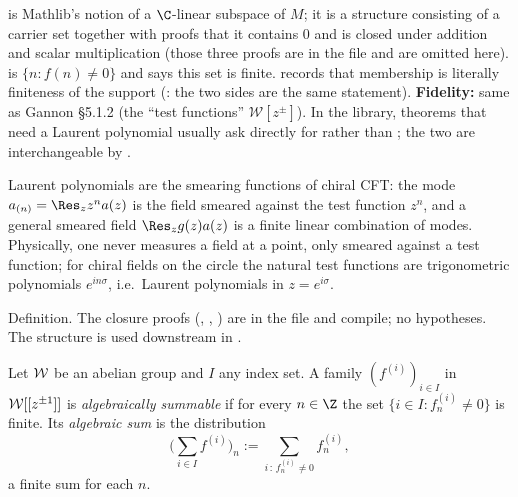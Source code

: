 \begin{dictionary}
 is Mathlib's notion of a $\C$-linear subspace of $M$; it is a structure
consisting of a carrier set together with proofs that it contains $0$ and is closed under
addition and scalar multiplication (those three proofs are in the file and are omitted here).
 is $\{n : f(n)\neq0\}$ and  says this set is finite.
 records that membership is literally finiteness of the support
(: the two sides are the same statement). \textbf{Fidelity:} same as Gannon §5.1.2
(the ``test functions'' $\mathcal W[z^{\pm}]$). In the library, theorems that need a Laurent
polynomial usually ask directly for  rather than
; the two are interchangeable by .
\end{dictionary}

\begin{physics}
Laurent polynomials are the smearing functions of chiral CFT: the mode $a_{(n)} = \Res_z z^na(z)$ is
the field smeared against the test function $z^n$, and a general smeared field
$\Res_z g(z)a(z)$ is a finite linear combination of modes. Physically, one never measures a field
at a point, only smeared against a test function; for chiral fields on the circle the natural test
functions are trigonometric polynomials $e^{in\sigma}$, i.e.\ Laurent polynomials in $z = e^{i\sigma}$.
\end{physics}

\begin{status}
Definition. The closure proofs (, , ) are in the file and
compile; no hypotheses. The structure  is used downstream in
.
\end{status}

\begin{definition}\label{l01:def:algsum}
Let $\mathcal{W}$ be an abelian group and $I$ any index set. A family
$(f^{(i)})_{i\in I}$ in $\mathcal{W}[[z^{\pm1}]]$ is \emph{algebraically summable} if for every $n\in\Z$
the set $\{i\in I : f^{(i)}_n\neq0\}$ is finite. Its \emph{algebraic sum} is the distribution
\begin{equation*}
  \Big(\sum_{i\in I}f^{(i)}\Big)_n := \sum_{i\,:\,f^{(i)}_n\neq0} f^{(i)}_n ,
\end{equation*}
a finite sum for each $n$.
\end{definition}

